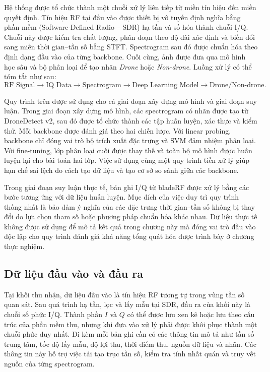 \documentclass[../DoAn.tex]{subfiles}
\begin{document}
Hệ thống được tổ chức thành một chuỗi xử lý liên tiếp từ miền tín hiệu đến miền quyết định. Tín hiệu RF tại đầu vào được thiết bị vô tuyến định nghĩa bằng phần mềm (Software-Defined Radio -- SDR) hạ tần và số hóa thành chuỗi I/Q. Chuỗi này được kiểm tra chất lượng, phân đoạn theo độ dài xác định và biến đổi sang miền thời gian--tần số bằng STFT. Spectrogram sau đó được chuẩn hóa theo định dạng đầu vào của từng backbone. Cuối cùng, ảnh được đưa qua mô hình học sâu và bộ phân loại để tạo nhãn \textit{Drone} hoặc \textit{Non-drone}. Luồng xử lý có thể tóm tắt như sau:
\begin{equation}
    \text{RF Signal}
    \longrightarrow
    \text{IQ Data}
    \longrightarrow
    \text{Spectrogram}
    \longrightarrow
    \text{Deep Learning Model}
    \longrightarrow
    \text{Drone/Non-drone}.
\end{equation}


Quy trình trên được sử dụng cho cả giai đoạn xây dựng mô hình và giai đoạn suy luận. Trong giai đoạn xây dựng mô hình, các spectrogram có nhãn được tạo từ DroneDetect v2, sau đó được tổ chức thành các tập huấn luyện, xác thực và kiểm thử. Mỗi backbone được đánh giá theo hai chiến lược. Với linear probing, backbone chỉ đóng vai trò bộ trích xuất đặc trưng và SVM đảm nhiệm phân loại. Với fine-tuning, lớp phân loại cuối được thay thế và toàn bộ mô hình được huấn luyện lại cho bài toán hai lớp. Việc sử dụng cùng một quy trình tiền xử lý giúp hạn chế sai lệch do cách tạo dữ liệu và tạo cơ sở so sánh giữa các backbone.

Trong giai đoạn suy luận thực tế, bản ghi I/Q từ bladeRF được xử lý bằng các bước tương ứng với dữ liệu huấn luyện. Mục đích của việc duy trì quy trình thống nhất là bảo đảm ý nghĩa của các đặc trưng thời gian--tần số không bị thay đổi do lựa chọn tham số hoặc phương pháp chuẩn hóa khác nhau. Dữ liệu thực tế không được sử dụng để mô tả kết quả trong chương này mà đóng vai trò đầu vào độc lập cho quy trình đánh giá khả năng tổng quát hóa được trình bày ở chương thực nghiệm.

\subsection{Dữ liệu đầu vào và đầu ra}

Tại khối thu nhận, dữ liệu đầu vào là tín hiệu RF tương tự trong vùng tần số quan sát. Sau quá trình hạ tần, lọc và lấy mẫu tại SDR, đầu ra của khối này là chuỗi số phức I/Q. Thành phần $I$ và $Q$ có thể được lưu xen kẽ hoặc lưu theo cấu trúc của phần mềm thu, nhưng khi đưa vào xử lý phải được khôi phục thành một chuỗi phức duy nhất. Đi kèm mỗi bản ghi cần có các thông tin mô tả như tần số trung tâm, tốc độ lấy mẫu, độ lợi thu, thời điểm thu, nguồn dữ liệu và nhãn. Các thông tin này hỗ trợ việc tái tạo trục tần số, kiểm tra tính nhất quán và truy vết nguồn của từng spectrogram.
\end{document}
